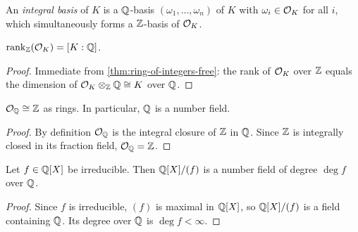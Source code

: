 \begin{definition}
  \label{def:integral-basis}
  \leanok
  An \emph{integral basis} of $K$ is a $\mathbb{Q}$-basis $(\omega_1, \ldots, \omega_n)$
  of $K$ with $\omega_i \in \mathcal{O}_K$ for all $i$, which simultaneously forms
  a $\mathbb{Z}$-basis of $\mathcal{O}_K$.
\end{definition}

\begin{theorem}
  \label{thm:rank-ring-of-integers}
  \leanok
  $\mathrm{rank}_{\mathbb{Z}}(\mathcal{O}_K) = [K : \mathbb{Q}]$.
\end{theorem}
\begin{proof}
  \leanok
  Immediate from \cref{thm:ring-of-integers-free}: the rank of $\mathcal{O}_K$ over
  $\mathbb{Z}$ equals the dimension of $\mathcal{O}_K \otimes_{\mathbb{Z}} \mathbb{Q} \cong K$ over $\mathbb{Q}$.
\end{proof}

\begin{proposition}
  \label{prop:ring-of-integers-rat}
  \leanok
  $\mathcal{O}_{\mathbb{Q}} \cong \mathbb{Z}$ as rings. In particular, $\mathbb{Q}$ is a number field.
\end{proposition}
\begin{proof}
  \leanok
  By definition $\mathcal{O}_{\mathbb{Q}}$ is the integral closure of $\mathbb{Z}$ in $\mathbb{Q}$. Since
  $\mathbb{Z}$ is integrally closed in its fraction field, $\mathcal{O}_{\mathbb{Q}} = \mathbb{Z}$.
\end{proof}

\begin{proposition}
  \label{prop:adjoin-root-number-field}
  \leanok
  Let $f \in \mathbb{Q}[X]$ be irreducible. Then $\mathbb{Q}[X]/(f)$ is a number field
  of degree $\deg f$ over $\mathbb{Q}$.
\end{proposition}
\begin{proof}
  \leanok
  Since $f$ is irreducible, $(f)$ is maximal in $\mathbb{Q}[X]$, so $\mathbb{Q}[X]/(f)$
  is a field containing $\mathbb{Q}$. Its degree over $\mathbb{Q}$ is $\deg f < \infty$.
\end{proof}
